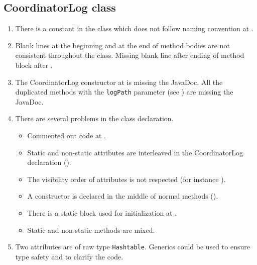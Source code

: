 \subsection{CoordinatorLog class}
\label{sec:coordinatorlog-class}
\begin{enumerate}
	\item {} There is a constant in the class which does not follow naming convention at .
    \item {} Blank lines at the beginning and at the end of method bodies are not consistent throughout the class.
    Missing blank line after ending of method block after .
    \item {} The CoordinatorLog constructor at  is missing the JavaDoc.
    All the duplicated methods with the \texttt{logPath} parameter (see ) are missing the JavaDoc.
    \item {} There are several problems in the class declaration.
    \begin{itemize}
        \item  Commented out code at .
        \item Static and non-static attributes are interleaved in the CoordinatorLog declaration ().
        \item The visibility order of attributes is not respected (for instance ).
        \item A constructor is declared in the middle of normal methods ().
        \item There is a static block used for initialization at .
        \item Static and non-static methods are mixed.
    \end{itemize}
    \item {} Two attributes are of raw type \texttt{Hashtable}. Generics could be used to ensure type safety and to clarify the code.


\end{enumerate}

